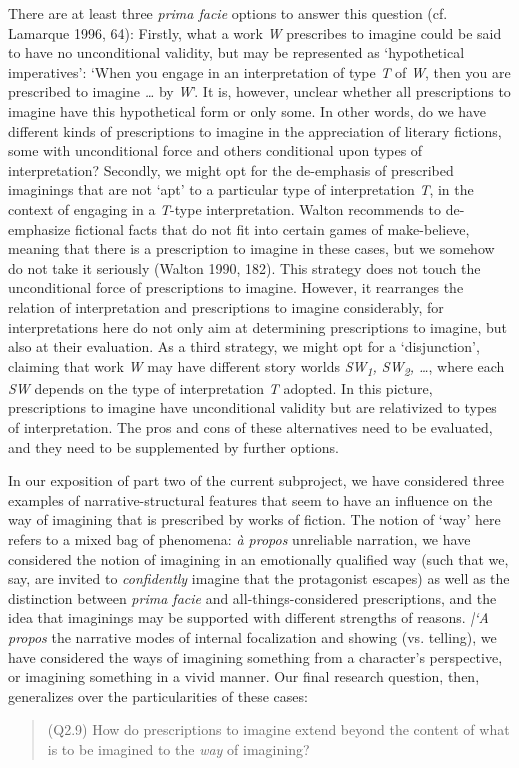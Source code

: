\noindent There are at least three \emph{prima facie} options to answer this
question (cf. Lamarque 1996, 64): Firstly, what a work \emph{W}
prescribes to imagine could be said to have no unconditional validity,
but may be represented as `hypothetical imperatives': `When you engage
in an interpretation of type \emph{T} of \emph{W}, then you are
prescribed to imagine \emph{\ldots} by \emph{W}'. It is, however,
unclear whether all prescriptions to imagine have this hypothetical form
or only some. In other words, do we have different kinds of
prescriptions to imagine in the appreciation of literary fictions, some
with unconditional force and others conditional upon types of
interpretation? Secondly, we might opt for the de-emphasis of prescribed
imaginings that are not `apt' to a particular type of interpretation
\emph{T}, in the context of engaging in a \emph{T}-type interpretation.
Walton recommends to de-emphasize fictional facts that do not fit into
certain games of make-believe, meaning that there is a prescription to
imagine in these cases, but we somehow do not take it seriously (Walton
1990, 182). This strategy does not touch the unconditional force of
prescriptions to imagine. However, it rearranges the relation of
interpretation and prescriptions to imagine considerably, for
interpretations here do not only aim at determining prescriptions to
imagine, but also at their evaluation. As a third strategy, we might opt
for a `disjunction', claiming that work \emph{W} may have different
story worlds \emph{SW\textsubscript{1}, SW\textsubscript{2}, \ldots},
where each \emph{SW} depends on the type of interpretation \emph{T}
adopted. In this picture, prescriptions to imagine have unconditional
validity but are relativized to types of interpretation. The pros and
cons of these alternatives need to be evaluated, and they need to be
supplemented by further options. 

In our exposition of part two of the current subproject, we have
considered three examples of narrative-structural features that seem to
have an influence on the way of imagining that is prescribed by works of
fiction. The notion of `way' here refers to a mixed bag of phenomena:
\emph{\`a propos} unreliable narration, we have considered the notion of
imagining in an emotionally qualified way (such that we, say, are
invited to \emph{confidently} imagine that the protagonist escapes) as
well as the distinction between \emph{prima facie} and
all-things-considered prescriptions, and the idea that imaginings may be
supported with different strengths of reasons. \emph{|`A propos} the
narrative modes of internal focalization and showing (vs. telling), we
have considered the ways of imagining something from a character's
perspective, or imagining something in a vivid manner. Our final
research question, then, generalizes over the particularities of these
cases:

\vspace{-.2cm}
\begin{quote}
(Q2.9) How do prescriptions to imagine extend beyond the content of
what is to be imagined to the  \emph{way} of imagining?
\end{quote}
\vspace{-.2cm}

